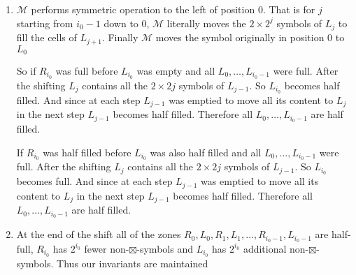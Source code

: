 \documentclass[a4paper, 11pt]{article}
\begin{document}
{\begin{enumerate}
			Now if $R_{i_0}$ was full before we shift the $2\times 2^{i_0}-1$ to the $R_0,\dots,R_{i_0}$ each of the zones becomes half filled. In other words we shift the leftmost $ 2^{i_0}-1$ non-$\boxtimes$-symbols to the zones $R_0,\dots,R_{i_0-1}$ each of which becomes half filled because in total they take the space $\sum\limits_{i=0}^{i_0-1}2\times 2^i=2(2^{i_0}-1)$. And hence $R_{i_0}$ also becomes half filled because $2^{i_0}$ non-$\boxtimes$-symbols remain in $R_{i_0}$
			
			If $R_{i_0}$ was half-full before we shift the $2^{i_0}-1$ non-$\boxtimes$-symbols of $R_{i_0}$ into the zones $R_0,\dots, R_{i_0-1}$ filling up exactly half of the symbols of each $R_i$ zones where $i\in \{0,\dots, i_0-1\}$. Now the zone $R_{i_0}$ is empty.
			\item $\mathcal{M}$ performs symmetric operation to the left of position 0. That is for $j$ starting from $i_0-1$ down to 0, $\mathcal{M}$ literally moves the $2\times 2^j$ symbols of $L_j$ to fill the cells of $L_{j+1}$. Finally $\mathcal{M}$ moves the symbol originally in position 0 to $L_0$\parinn
			
			So if $R_{i_0}$ was full before $L_{i_0}$ was empty and all $L_0,\dots, L_{i_0-1}$ were full. After the shifting $L_{j}$ contains all the $2\times 2j$ symbols of $L_{j-1}$. So $L_{i_0}$ becomes half filled. And since at each step $L_{j-1}$ was emptied to move all its content to $L_{j}$ in the next step $L_{j-1}$ becomes half filled. Therefore all $L_0,\dots,L_{i_0-1}$ are half filled.
			
			If $R_{i_0}$ was half filled before $L_{i_0}$ was also half filled and all $L_0,\dots, L_{i_0-1}$ were full. After the shifting $L_{j}$ contains all the $2\times 2j$ symbols of $L_{j-1}$. So $L_{i_0}$ becomes full. And since at each step $L_{j-1}$ was emptied to move all its content to $L_{j}$ in the next step $L_{j-1}$ becomes half filled. Therefore all $L_0,\dots,L_{i_0-1}$ are half filled.
			\item At the end of the shift all of the zones $R_0,L_0,R_1,L_1,\dots,R_{i_0-1},L_{i_0-1}$ are half-full, $R_{i_0}$ has $2^{i_0}$ fewer non-$\boxtimes$-symbols and $L_{i_0}$ has $2^{i_0}$ additional non-$\boxtimes$-symbols. Thus our invariants are maintained
		\end{enumerate}
		
}
\end{document}
